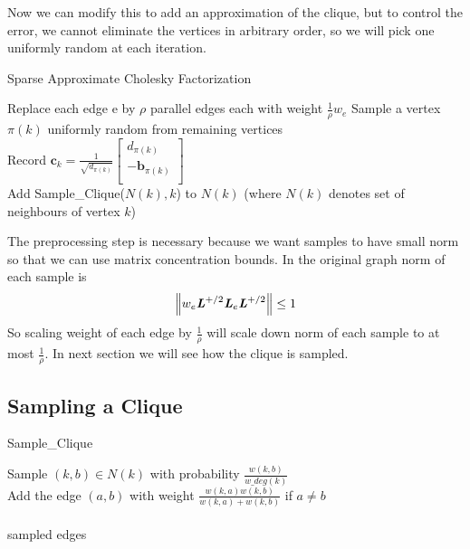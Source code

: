 \documentclass[11pt]{article}
\begin{document}
Now we can modify this to add an approximation of the clique, but to control the error, we cannot eliminate the vertices in arbitrary order, so we will pick one uniformly random at each iteration.

\begin{algorithm}
\caption {Sparse Approximate Cholesky Factorization}
\begin{algorithmic}[0]
\item Replace each edge e by $\rho$ parallel edges each with weight $\frac {1}{\rho} w_e$ 
\State Sample a vertex $\pi (k)$ uniformly random from remaining vertices\\
\State Record $\mathbf{c}_k = \frac {1}{\sqrt{d_{\pi(k)}}} 
\left[\begin{matrix}d_{\pi(k)}\\
-\mathbf{b}_{\pi(k)}\\ 
\end{matrix}\right]$\\
\State Add Sample\_Clique($N(k), k$) to $N(k)$ (where $N(k)$ denotes set of neighbours of vertex $k$)\\
\EndFor
\end{algorithmic}
\end{algorithm}

The preprocessing step is necessary because we want samples to have small norm so that we can use matrix concentration bounds. In the original graph norm of each sample is
\[\left\lVert w_e \boldsymbol{\mathit{L}}^{+/2} \boldsymbol{\mathit{L}}_e \boldsymbol{\mathit{L}}^{+/2} \right\rVert \le 1\] 
So scaling weight of each edge by $\frac{1}{\rho}$ will scale down norm of each sample to at most $\frac{1}{\rho}$. In next section we will see how the clique is sampled.


\subsection{Sampling a Clique}

\begin{algorithm}[H]
\caption{Sample\_Clique}
\begin{algorithmic}[0]
\State Sample $(k,b) \in N(k)$ with probability $\frac {w(k,b)}{w\_deg(k)}$\\
\State Add the edge $(a, b)$ with weight $\frac {w(k,a)w(k,b)}{w(k,a)+w(k,b)}$ if $a \ne b$\\
\EndFor\\
\Return sampled edges
\EndProcedure
\end{algorithmic}
\end{algorithm}
\end{document}
